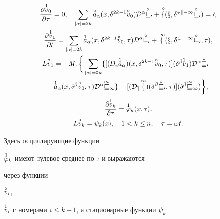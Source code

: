 \begin{gather} 


\frac{\partial\up{1}{v}_0}{\partial\tau}=0,\quad 


\sum_{|\alpha|=2k}\up{\circ}{a}_\alpha(x,\delta^{2k-1} 


\up{\circ}{v}_0)\cal D^\alpha\up{\circ}{v}_0+ 


\up{\,\circ}{f}(x,\delta^{2k-1}\up{\circ}{v}_0)=0,\\ 


% 


\frac{\partial\up{1}{v}_1}{\partial t}=\sum_{|\alpha|=2k} 


\up{1}{a}_\alpha(x,\delta^{2k-1}\up{\circ}{v}_0,\tau) 


\cal D^\alpha\up{\circ}{v}_0+\up{\,1}{f} 


(x,\delta^{2k-1}\up{\circ}{v}_0,\tau),\\ 


% 


L\up{\circ}{v}_1=-M_\tau\bigg\{\sum_{|\alpha|=2k} 


\{[(D_e\up{1}{a}_\alpha)(x,\delta^{2k-1} 


\up{\circ}{v}_0,\tau)](\delta^\beta\up{1}{v}_1) 


\cal D^\alpha\up{\circ}{v}_0-\notag \\ 


% 


-\up{1}{a}_\alpha(x,\delta^\beta\up{\circ}{v}_0,\tau) 


\cal D^\alpha\up{1}{v}_1\}-[(D_e\up{\,1}{f}) 


(\delta^\beta\up{\circ}{v}_0,\tau)](\delta^\beta 


\up{1}{v}_1)\bigg\},\\ 


% 


\frac{\partial\up{1}{v}_k}{\partial\tau}= 


\up{1}{\varphi}_k(x,\tau),\\ 


L\up{\circ}{v}_k=\psi_k(x),\quad 1<k\le n,\quad \tau=\omega t.


\end{gather} 


Здесь осциллирующие функции 


$\overset{1}{\varphi}{}_k$ имеют нулевое среднее по $\tau$ и выражаются 


через функции 


$\overset{\circ}{v}{}_i$, 


$\overset{1}{v}{}_i$ с номерами $i\le k-1$, а стационарные функции $\psi_k$ 


